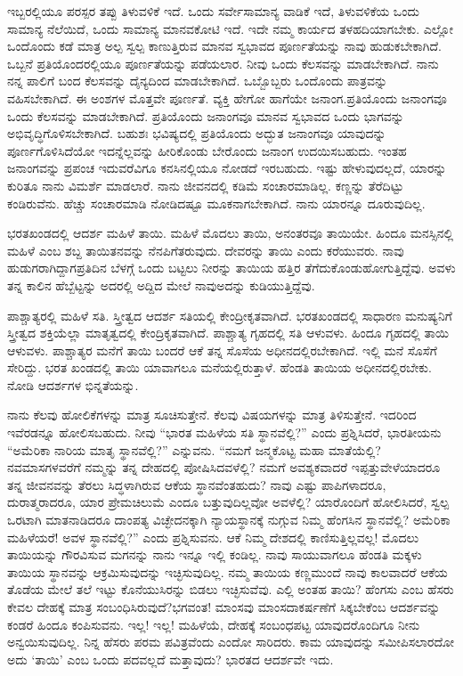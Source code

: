 ಇಬ್ಬರಲ್ಲಿಯೂ ಪರಸ್ಪರ ತಪ್ಪು ತಿಳುವಳಿಕೆ ಇದೆ. ಒಂದು ಸರ್ವೇಸಾಮಾನ್ಯ ವಾಡಿಕೆ ಇದೆ, ತಿಳುವಳಿಕೆಯ ಒಂದು ಸಾಮಾನ್ಯ ನೆಲೆಯಿದೆ, ಒಂದು ಸಾಮಾನ್ಯ ಮಾನವಕೋಟಿ ಇದೆ. ಇದೇ ನಮ್ಮ ಕಾರ್ಯದ ತಳಹದಿಯಾಗಬೇಕು. ಎಲ್ಲೋ ಒಂದೊಂದು ಕಡೆ ಮಾತ್ರ ಅಲ್ಪ ಸ್ವಲ್ಪ ಕಾಣುತ್ತಿರುವ ಮಾನವ ಸ್ವಭಾವದ ಪೂರ್ಣತೆಯನ್ನು ನಾವು ಹುಡುಕಬೇಕಾಗಿದೆ. ಒಬ್ಬನೆ ಪ್ರತಿಯೊಂದರಲ್ಲಿಯೂ ಪೂರ್ಣತೆಯನ್ನು ಪಡೆಯಲಾರ. ನೀವು ಒಂದು ಕೆಲಸವನ್ನು ಮಾಡಬೇಕಾಗಿದೆ. ನಾನು ನನ್ನ ಪಾಲಿಗೆ ಬಂದ ಕೆಲಸವನ್ನು ದೈನ್ಯದಿಂದ ಮಾಡಬೇಕಾಗಿದೆ. ಒಬ್ಬೊಬ್ಬರು ಒಂದೊಂದು ಪಾತ್ರವನ್ನು ವಹಿಸಬೇಕಾಗಿದೆ. ಈ ಅಂಶಗಳ ಮೊತ್ತವೇ ಪೂರ್ಣತೆ. ವ್ಯಕ್ತಿ ಹೇಗೋ ಹಾಗೆಯೇ ಜನಾಂಗ.\break ಪ್ರತಿಯೊಂದು ಜನಾಂಗವೂ ಒಂದು ಕೆಲಸವನ್ನು ಮಾಡಬೇಕಾಗಿದೆ. ಪ್ರತಿಯೊಂದು ಜನಾಂಗವೂ ಮಾನವ ಸ್ವಭಾವದ ಒಂದು ಭಾಗವನ್ನು ಅಭಿವೃದ್ಧಿಗೊಳಿಸಬೇಕಾಗಿದೆ. ಬಹುಶಃ ಭವಿಷ್ಯದಲ್ಲಿ ಪ್ರತಿಯೊಂದು ಅದ್ಭುತ ಜನಾಂಗವೂ ಯಾವುದನ್ನು ಪೂರ್ಣಗೊಳಿಸಿದೆಯೋ ಇದನ್ನೆಲ್ಲವನ್ನು ಹೀರಿಕೊಂಡು ಬೇರೊಂದು ಜನಾಂಗ ಉದಯಿಸಬಹುದು. ಇಂತಹ ಜನಾಂಗವನ್ನು ಪ್ರಪಂಚ ಇದುವರೆವಿಗೂ ಕನಸಿನಲ್ಲಿಯೂ ನೋಡದೆ ಇರಬಹುದು. ಇಷ್ಟು ಹೇಳುವುದಲ್ಲದೆ, ಯಾರನ್ನು ಕುರಿತೂ ನಾನು ವಿಮರ್ಶೆ ಮಾಡಲಾರೆ. ನಾನು ಜೀವನದಲ್ಲಿ ಕಡಿಮೆ ಸಂಚಾರಮಾಡಿಲ್ಲ. ಕಣ್ಣನ್ನು ತೆರೆದಿಟ್ಟು ಕಂಡಿರುವೆನು. ಹೆಚ್ಚು ಸಂಚಾರಮಾಡಿ ನೋಡಿದಷ್ಟೂ ಮೂಕನಾಗಬೇಕಾಗಿದೆ. ನಾನು ಯಾರನ್ನೂ ದೂರುವುದಿಲ್ಲ.

ಭರತಖಂಡದಲ್ಲಿ ಆದರ್ಶ ಮಹಿಳೆ ತಾಯಿ. ಮಹಿಳೆ ಮೊದಲು ತಾಯಿ, ಅನಂತರವೂ ತಾಯಿಯೇ. ಹಿಂದೂ ಮನಸ್ಸಿನಲ್ಲಿ ಮಹಿಳೆ ಎಂಬ ಶಬ್ದ ತಾಯಿತನವನ್ನು ನೆನಪಿಗೆ\break ತರುವುದು. ದೇವರನ್ನು ತಾಯಿ ಎಂದು ಕರೆಯುವರು. ನಾವು ಹುಡುಗರಾಗಿದ್ದಾಗ\break ಪ್ರತಿದಿನ ಬೆಳಗ್ಗೆ ಒಂದು ಬಟ್ಟಲು ನೀರನ್ನು ತಾಯಿಯ ಹತ್ತಿರ ತೆಗೆದುಕೊಂಡು\break ಹೋಗುತ್ತಿದ್ದೆವು. ಅವಳು ತನ್ನ ಕಾಲಿನ ಹೆಬ್ಬೆಟ್ಟನ್ನು ಅದರಲ್ಲಿ ಅದ್ದಿದ ಮೇಲೆ ನಾವು\break ಅದನ್ನು ಕುಡಿಯುತ್ತಿದ್ದೆವು.

ಪಾಶ್ಚಾತ್ಯರಲ್ಲಿ ಮಹಿಳೆ ಸತಿ. ಸ್ತ್ರೀತ್ವದ ಆದರ್ಶ ಸತಿಯಲ್ಲಿ ಕೇಂದ್ರೀಕೃತವಾಗಿದೆ. ಭರತಖಂಡದಲ್ಲಿ ಸಾಧಾರಣ ಮನುಷ್ಯನಿಗೆ ಸ್ತ್ರೀತ್ವದ ಶಕ್ತಿಯೆಲ್ಲಾ ಮಾತೃತ್ವದಲ್ಲಿ ಕೇಂದ್ರಿಕೃತವಾಗಿದೆ. ಪಾಶ್ಚಾತ್ಯ ಗೃಹದಲ್ಲಿ ಸತಿ ಆಳುವಳು. ಹಿಂದೂ ಗೃಹದಲ್ಲಿ ತಾಯಿ ಆಳುವಳು. ಪಾಶ್ಚಾತ್ಯರ ಮನೆಗೆ ತಾಯಿ ಬಂದರೆ ಆಕೆ ತನ್ನ ಸೊಸೆಯ ಅಧೀನದಲ್ಲಿರಬೇಕಾಗಿದೆ. ಇಲ್ಲಿ ಮನೆ ಸೊಸೆಗೆ ಸೇರಿದ್ದು. ಭರತ ಖಂಡದಲ್ಲಿ ತಾಯಿ ಯಾವಾಗಲೂ ಮನೆಯಲ್ಲಿರುತ್ತಾಳೆ. ಹೆಂಡತಿ ತಾಯಿಯ ಅಧೀನದಲ್ಲಿರಬೇಕು. ನೋಡಿ ಆದರ್ಶಗಳ ಭಿನ್ನತೆಯನ್ನು.

ನಾನು ಕೆಲವು ಹೋಲಿಕೆಗಳನ್ನು ಮಾತ್ರ ಸೂಚಿಸುತ್ತೇನೆ. ಕೆಲವು ವಿಷಯಗಳನ್ನು ಮಾತ್ರ ತಿಳಿಸುತ್ತೇನೆ. ಇದರಿಂದ ಇವೆರಡನ್ನೂ ಹೋಲಿಸಬಹುದು. ನೀವು “ಭಾರತ ಮಹಿಳೆಯ ಸತಿ ಸ್ಥಾನವೆಲ್ಲಿ?” ಎಂದು ಪ್ರಶ್ನಿಸಿದರೆ, ಭಾರತೀಯನು “ಅಮೆರಿಕಾ ನಾರಿಯ ಮಾತೃ ಸ್ಥಾನವೆಲ್ಲಿ?” ಎನ್ನುವನು. “ನಮಗೆ ಜನ್ಮಕೊಟ್ಟ ಮಹಾ ಮಾತೆಯೆಲ್ಲಿ? ನವಮಾಸಗಳವರೆಗೆ ನಮ್ಮನ್ನು ತನ್ನ ದೇಹದಲ್ಲಿ ಪೋಷಿಸಿದವಳೆಲ್ಲಿ? ನಮಗೆ ಅವಶ್ಯಕವಾದರೆ ಇಪ್ಪತ್ತು\break ವೇಳೆಯಾದರೂ ತನ್ನ ಜೀವನವನ್ನು ತೆರಲು ಸಿದ್ಧಳಾಗಿರುವ ಆಕೆಯ ಸ್ಥಾನವೆಂತಹುದು? ನಾವು ಎಷ್ಟು ಪಾಪಿಗಳಾದರೂ, ದುರಾತ್ಮರಾದರೂ, ಯಾರ ಪ್ರೇಮಚಿಲುಮೆ ಎಂದೂ ಬತ್ತುವುದಿಲ್ಲವೋ ಅವಳೆಲ್ಲಿ? ಯಾರೊಂದಿಗೆ ಹೋಲಿಸಿದರೆ, ಸ್ವಲ್ಪ ಒರಟಾಗಿ ಮಾತನಾಡಿದರೂ ದಾಂಪತ್ಯ ವಿಚ್ಛೇದನಕ್ಕಾಗಿ ನ್ಯಾಯಸ್ಥಾನಕ್ಕೆ ನುಗ್ಗುವ ನಿಮ್ಮ ಹೆಂಗಸಿನ ಸ್ಥಾನವೆಲ್ಲಿ? ಅಮೆರಿಕಾ ಮಹಿಳೆಯರೆ! ಅವಳ ಸ್ಥಾನವೆಲ್ಲಿ?” ಎಂದು ಪ್ರಶ್ನಿಸುವನು. ಆಕೆ ನಿಮ್ಮ ದೇಶದಲ್ಲಿ ಕಾಣಿಸುತ್ತಿಲ್ಲವಲ್ಲ! ಮೊದಲು ತಾಯಿಯನ್ನು ಗೌರವಿಸುವ ಮಗನನ್ನು ನಾನು ಇನ್ನೂ ಇಲ್ಲಿ ಕಂಡಿಲ್ಲ. ನಾವು ಸಾಯುವಾಗಲೂ ಹೆಂಡತಿ ಮಕ್ಕಳು ತಾಯಿಯ ಸ್ಥಾನವನ್ನು ಆಕ್ರಮಿಸುವುದನ್ನು ಇಚ್ಛಿಸುವುದಿಲ್ಲ. ನಮ್ಮ ತಾಯಿಯ ಕಣ್ಣಮುಂದೆ ನಾವು ಕಾಲವಾದರೆ ಆಕೆಯ ತೊಡೆಯ ಮೇಲೆ ತಲೆ ಇಟ್ಟು ಕೊನೆಯುಸಿರನ್ನು ಬಿಡಲು ಇಚ್ಛಿಸುವೆವು. ಎಲ್ಲಿ ಅಂತಹ ತಾಯಿ? ಹೆಂಗಸು ಎಂಬ ಹೆಸರು ಕೇವಲ ದೇಹಕ್ಕೆ ಮಾತ್ರ ಸಂಬಂಧಿಸಿರುವುದೆ?\break ಭಗವಂತ! ಮಾಂಸವು ಮಾಂಸದಾಕರ್ಷಣೆಗೆ ಸಿಕ್ಕಬೇಕೆಂಬ ಆದರ್ಶವನ್ನು ಕಂಡರೆ ಹಿಂದೂ ಕಂಪಿಸುವನು. ಇಲ್ಲ! ಇಲ್ಲ! ಮಹಿಳೆಯೆ, ದೇಹಕ್ಕೆ ಸಂಬಂಧಪಟ್ಟ ಯಾವುದರೊಂದಿಗೂ ನೀನು ಅನ್ವಯಿಸುವುದಿಲ್ಲ. ನಿನ್ನ ಹೆಸರು ಪರಮ ಪವಿತ್ರವೆಂದು ಎಂದೋ ಸಾರಿದರು. ಕಾಮ ಯಾವುದನ್ನು ಸಮೀಪಿಸಲಾರದೋ ಅದು ‘ತಾಯಿ’ ಎಂಬ ಒಂದು ಪದವಲ್ಲದೆ ಮತ್ತಾವುದು? ಭಾರತದ ಆದರ್ಶವೇ ಇದು.

